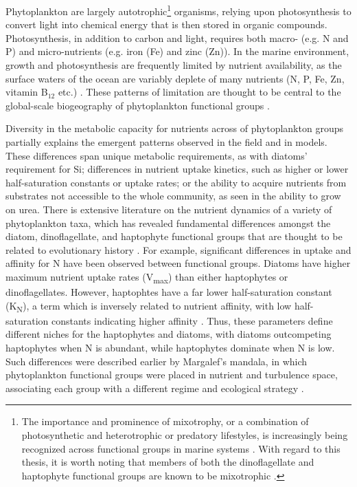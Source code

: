 Phytoplankton are largely autotrophic\footnote{The importance and prominence of mixotrophy, or a combination of photosynthetic and heterotrophic or predatory lifestyles, is increasingly being recognized across functional groups in marine systems \citep{Worden2015}.  With regard to this thesis, it is worth noting that members of both the dinoflagellate and haptophyte functional groups are known to be mixotrophic \citep{Unrein2014, Jeong2010}.} organisms, relying upon photosynthesis to convert light into chemical energy that is then stored in organic compounds. Photosynthesis, in addition to carbon and light, requires both macro-  (e.g. N and P) and micro-nutrients (e.g. iron (Fe) and zinc (Zn)). In the marine environment, growth and photosynthesis are frequently limited by nutrient availability, as the surface waters of the ocean are variably deplete of many nutrients (N, P, Fe, Zn, vitamin B$_{12}$ etc.) \citep{Moore2004, Bertrand2007}. These patterns of limitation are thought to be central to the global-scale biogeography of phytoplankton functional groups \citep{Follows2007}.\par
 
Diversity in the metabolic capacity for nutrients across of phytoplankton groups partially explains the emergent patterns observed in the field and in models. These differences span unique metabolic requirements, as with diatoms' requirement for Si; differences in nutrient uptake kinetics, such as higher or lower half-saturation constants or uptake rates; or the ability to acquire nutrients from substrates not accessible to the whole community, as seen in the ability to grow on urea. There is extensive literature on the nutrient dynamics of a variety of phytoplankton taxa, which has revealed fundamental differences amongst the diatom, dinoflagellate, and haptophyte functional groups that are thought to be related to evolutionary history \citep{Litchman2008}. For example, significant differences in uptake and affinity for N have been observed between functional groups. Diatoms have higher maximum nutrient uptake rates (V\textsubscript{max}) than either haptophytes or dinoflagellates. However, haptophtes have a far lower half-saturation constant (K\textsubscript{N}), a term which is inversely related to nutrient affinity, with low half-saturation constants indicating higher affinity \citep{Litchman2007}. Thus, these parameters define different niches for the haptophytes and diatoms, with diatoms outcompeting haptophytes when N is abundant, while haptophytes dominate when N is low. Such differences were described earlier by Margalef's mandala, in which phytoplankton functional groups were placed in nutrient and turbulence space, associating each group with a different regime and ecological strategy \citep{Margalef1978}. \par

